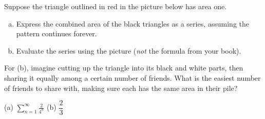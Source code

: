 \begin{question}\label{prob_s3.2:pic1}
Suppose the triangle outlined in red in the picture below has area one.
\begin{center}
\end{center}
\begin{enumerate}[(a)]
\item Express the combined area of the black triangles as a series, assuming the pattern continues forever.
\item Evaluate the series using the picture (\emph{not} the formula from your book).
\end{enumerate}
\end{question}
\begin{hint}
For (b), imagine cutting up the triangle into its black and white parts, then sharing it equally among a certain number of friends. What is the easiest number of friends to share with, making sure each has the same area in their pile?
\end{hint}
\begin{answer}
(a) $\displaystyle\sum_{n=1}^\infty \frac{2}{4^n}$ \qquad (b) $\dfrac23$
\end{answer}
